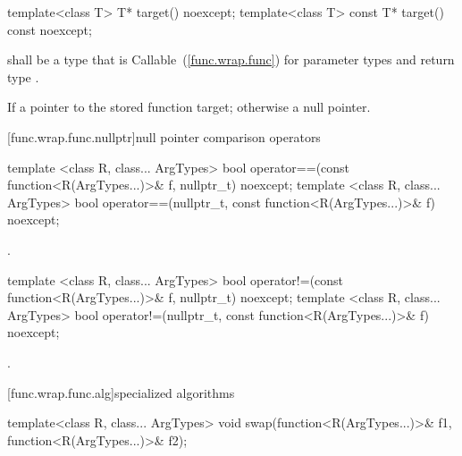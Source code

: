 %
%
\begin{itemdecl}
template<class T>       T* target() noexcept;
template<class T> const T* target() const noexcept;
\end{itemdecl}

\begin{itemdescr}
\pnum
\requires {} shall be a type that is
Callable~(\ref{func.wrap.func}) for parameter types
and return type .

\pnum\returns If 
a pointer to the stored function target; otherwise a null pointer.
\end{itemdescr}

[func.wrap.func.nullptr]{null pointer comparison operators}

%
%
\begin{itemdecl}
template <class R, class... ArgTypes>
  bool operator==(const function<R(ArgTypes...)>& f, nullptr_t) noexcept;
template <class R, class... ArgTypes>
  bool operator==(nullptr_t, const function<R(ArgTypes...)>& f) noexcept;
\end{itemdecl}

\begin{itemdescr}
\pnum\returns {}.
\end{itemdescr}

%
%
\begin{itemdecl}
template <class R, class... ArgTypes>
  bool operator!=(const function<R(ArgTypes...)>& f, nullptr_t) noexcept;
template <class R, class... ArgTypes>
  bool operator!=(nullptr_t, const function<R(ArgTypes...)>& f) noexcept;
\end{itemdecl}

\begin{itemdescr}
\pnum\returns {}.
\end{itemdescr}

[func.wrap.func.alg]{specialized algorithms}

%
%
\begin{itemdecl}
template<class R, class... ArgTypes>
  void swap(function<R(ArgTypes...)>& f1, function<R(ArgTypes...)>& f2);
\end{itemdecl}

